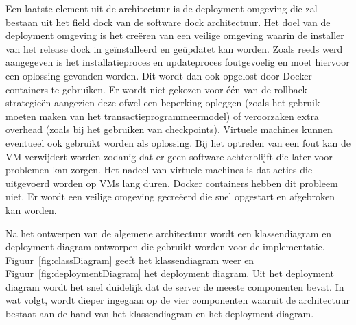 Een laatste element uit de architectuur is de deployment omgeving die zal bestaan uit het field dock van de software dock architectuur.
Het doel van de deployment omgeving is het creëren van een veilige omgeving waarin de installer van het release dock in geïnstalleerd en geüpdatet kan worden.
Zoals reeds werd aangegeven is het installatieproces en updateproces foutgevoelig en moet hiervoor een oplossing gevonden worden.
Dit wordt dan ook opgelost door Docker containers te gebruiken.
Er wordt niet gekozen voor één van de rollback strategieën aangezien deze ofwel een beperking opleggen (zoals het gebruik moeten maken van het transactieprogrammeermodel) of veroorzaken extra overhead (zoals bij het gebruiken van checkpoints).
Virtuele machines kunnen eventueel ook gebruikt worden als oplossing.
Bij het optreden van een fout kan de VM verwijdert worden zodanig dat er geen software achterblijft die later voor problemen kan zorgen.
Het nadeel van virtuele machines is dat acties die uitgevoerd worden op VMs lang duren.
Docker containers hebben dit probleem niet.
Er wordt een veilige omgeving gecreëerd die snel opgestart en afgebroken kan worden.

Na het ontwerpen van de algemene architectuur wordt een klassendiagram en deployment diagram ontworpen die gebruikt worden voor de implementatie.
Figuur~\vref{fig:classDiagram} geeft het klassendiagram weer en Figuur~\vref{fig:deploymentDiagram} het deployment diagram.
Uit het deployment diagram wordt het snel duidelijk dat de server de meeste componenten bevat.
In wat volgt, wordt dieper ingegaan op de vier componenten waaruit de architectuur bestaat aan de hand van het klassendiagram en het deployment diagram.

